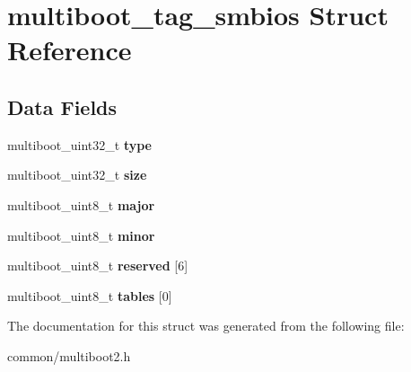\hypertarget{structmultiboot__tag__smbios}{}\section{multiboot\+\_\+tag\+\_\+smbios Struct Reference}
\label{structmultiboot__tag__smbios}
\subsection*{Data Fields}
\begin{DoxyCompactItemize}
\item 
multiboot\+\_\+uint32\+\_\+t {\bfseries type}\hypertarget{structmultiboot__tag__smbios_a65abd72a6d03ea2e37c038a4868c41c8}{}\label{structmultiboot__tag__smbios_a65abd72a6d03ea2e37c038a4868c41c8}

\item 
multiboot\+\_\+uint32\+\_\+t {\bfseries size}\hypertarget{structmultiboot__tag__smbios_abdadfb40a63d8fbf8b2771c3f70b344c}{}\label{structmultiboot__tag__smbios_abdadfb40a63d8fbf8b2771c3f70b344c}

\item 
multiboot\+\_\+uint8\+\_\+t {\bfseries major}\hypertarget{structmultiboot__tag__smbios_a1979fc6821ff6ffb79bd95c2794104a0}{}\label{structmultiboot__tag__smbios_a1979fc6821ff6ffb79bd95c2794104a0}

\item 
multiboot\+\_\+uint8\+\_\+t {\bfseries minor}\hypertarget{structmultiboot__tag__smbios_abe83621d3f54ab2868c75a6396b25729}{}\label{structmultiboot__tag__smbios_abe83621d3f54ab2868c75a6396b25729}

\item 
multiboot\+\_\+uint8\+\_\+t {\bfseries reserved} \mbox{[}6\mbox{]}\hypertarget{structmultiboot__tag__smbios_a2f56bc21103ebb0f6b97213052e0ab42}{}\label{structmultiboot__tag__smbios_a2f56bc21103ebb0f6b97213052e0ab42}

\item 
multiboot\+\_\+uint8\+\_\+t {\bfseries tables} \mbox{[}0\mbox{]}\hypertarget{structmultiboot__tag__smbios_ad0da28f2ea98e9c8f35a22c6a571f4a2}{}\label{structmultiboot__tag__smbios_ad0da28f2ea98e9c8f35a22c6a571f4a2}

\end{DoxyCompactItemize}


The documentation for this struct was generated from the following file\+:\begin{DoxyCompactItemize}
\item 
common/multiboot2.\+h\end{DoxyCompactItemize}
